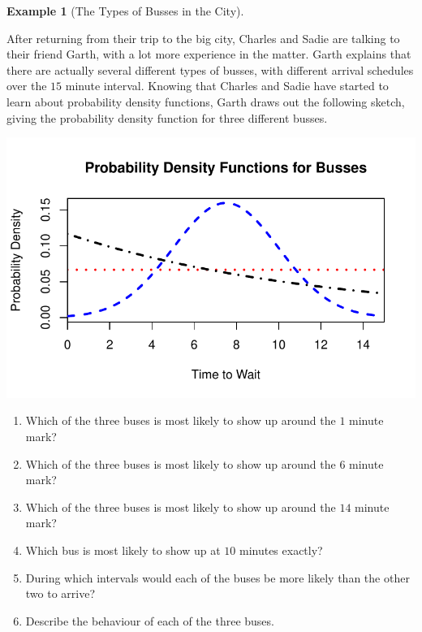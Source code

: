 \documentclass[
  letterpaper,
  DIV=11,
  numbers=noendperiod]{scrreprt}
\providecommand{\tightlist}{%
  \setlength{\itemsep}{0pt}\setlength{\parskip}{0pt}}\usepackage{longtable,booktabs,array}
\theoremstyle{definition}
\theoremstyle{definition}
\newtheorem{example}{Example}[chapter]
\theoremstyle{definition}
\theoremstyle{remark}
\begin{document}
\begin{example}[The Types of Busses in the
City]\protect\hypertarget{exm-bus-trips-two}{}\label{exm-bus-trips-two}

After returning from their trip to the big city, Charles and Sadie are
talking to their friend Garth, with a lot more experience in the matter.
Garth explains that there are actually several different types of
busses, with different arrival schedules over the \(15\) minute
interval. Knowing that Charles and Sadie have started to learn about
probability density functions, Garth draws out the following sketch,
giving the probability density function for three different busses.

\includegraphics{notes/chapter9_files/figure-pdf/unnamed-chunk-1-1.pdf}

\begin{enumerate}
\def\labelenumi{\alph{enumi}.}
\tightlist
\item
  Which of the three buses is most likely to show up around the \(1\)
  minute mark?
\item
  Which of the three buses is most likely to show up around the \(6\)
  minute mark?
\item
  Which of the three buses is most likely to show up around the \(14\)
  minute mark?
\item
  Which bus is most likely to show up at \(10\) minutes exactly?
\item
  During which intervals would each of the buses be more likely than the
  other two to arrive?
\item
  Describe the behaviour of each of the three buses.
\end{enumerate}

\begin{tcolorbox}[enhanced jigsaw, colback=white, colframe=quarto-callout-color-frame, arc=.35mm, leftrule=.75mm, rightrule=.15mm, opacityback=0, breakable, bottomrule=.15mm, left=2mm, toprule=.15mm]


\end{tcolorbox}
\end{example}
\end{document}
